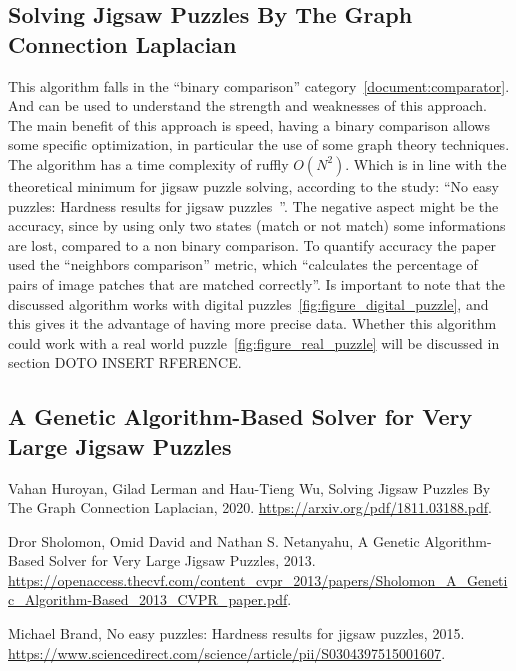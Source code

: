 \documentclass{article}
\begin{document}
\subsection{Solving Jigsaw Puzzles By The Graph Connection Laplacian~\cite{GCL}}
This algorithm falls in the “binary comparison” category~\ref{document:comparator}.
And can be used to understand the strength and weaknesses
of this approach.\newline
The main benefit of this approach is speed,  having a binary comparison allows
some specific optimization, in particular the use of some graph theory techniques.\newline
The  algorithm has a time complexity of ruffly \(O(N^2)\). Which is in line with the theoretical
minimum for jigsaw puzzle solving, according to the study:
“No easy puzzles: Hardness results for jigsaw puzzles~\cite{ON2Claim}”.\newline
The negative aspect might be the accuracy, since by using only two states
(match or not match) some informations are lost, compared to a non binary comparison.
To quantify accuracy the paper used the “neighbors comparison” metric,
which “calculates the percentage of pairs of image patches that are matched correctly”.\newline
Is important to note that the discussed algorithm works with 
digital puzzles~\ref{fig:figure_digital_puzzle}, and this gives it the advantage of having more precise data.\newline
Whether this algorithm could work with a real world puzzle~\ref{fig:figure_real_puzzle} will be discussed in section DOTO INSERT RFERENCE.



\subsection{A Genetic Algorithm-Based Solver for Very Large Jigsaw Puzzles~\cite{GA}}



\newpage
\begin{thebibliography}{9}

    Vahan Huroyan, Gilad   Lerman and Hau-Tieng Wu,
    Solving Jigsaw Puzzles By The Graph Connection Laplacian,
    2020.
    \url{https://arxiv.org/pdf/1811.03188.pdf}.
  
    Dror Sholomon, Omid David and Nathan S. Netanyahu,
    A Genetic Algorithm-Based Solver for Very Large Jigsaw Puzzles,
    2013.
    \url{https://openaccess.thecvf.com/content_cvpr_2013/papers/Sholomon_A_Genetic_Algorithm-Based_2013_CVPR_paper.pdf}.
  
    Michael Brand,
    No easy puzzles: Hardness results for jigsaw puzzles,
    2015.
    \url{https://www.sciencedirect.com/science/article/pii/S0304397515001607}.
  
\end{thebibliography}
\end{document}
